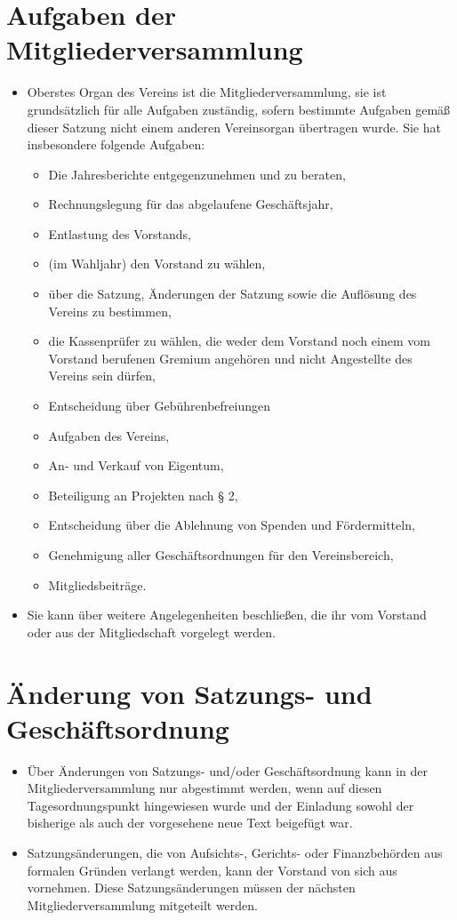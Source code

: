 \documentclass[a4paper,10pt]{article}
\begin{document}
\section{Aufgaben der Mitgliederversammlung}
  \begin{itemize}
   \item Oberstes Organ des Vereins ist die Mitgliederversammlung, sie ist grundsätzlich für alle Aufgaben zuständig, sofern bestimmte Aufgaben gemäß dieser Satzung nicht einem anderen Vereinsorgan übertragen wurde. Sie hat insbesondere folgende Aufgaben: 
   \begin{itemize}
    \item Die Jahresberichte entgegenzunehmen und zu beraten, 
    \item Rechnungslegung für das abgelaufene Geschäftsjahr, 
    \item Entlastung des Vorstands, 
    \item (im Wahljahr) den Vorstand zu wählen, 
    \item über die Satzung, Änderungen der Satzung sowie die Auflösung des Vereins zu bestimmen, 
    \item die Kassenprüfer zu wählen, die weder dem Vorstand noch einem vom Vorstand berufenen Gremium angehören und nicht Angestellte des Vereins sein dürfen, 
    \item Entscheidung über Gebührenbefreiungen
    \item Aufgaben des Vereins, 
    \item An- und Verkauf von Eigentum, 
    \item Beteiligung an Projekten nach § 2, 
    \item Entscheidung über die Ablehnung von Spenden und Fördermitteln, 
    \item Genehmigung aller Geschäftsordnungen für den Vereinsbereich, 
    \item Mitgliedsbeiträge. 
   \end{itemize}
   \item Sie kann über weitere Angelegenheiten beschließen, die ihr vom Vorstand oder aus der Mitgliedschaft vorgelegt werden. 
  \end{itemize}
  
\section{Änderung von Satzungs- und Geschäftsordnung}
  \begin{itemize}
   \item Über Änderungen von Satzungs- und/oder Geschäftsordnung kann in der Mitgliederversammlung nur abgestimmt werden, wenn auf diesen Tagesordnungspunkt hingewiesen wurde und der Einladung sowohl der bisherige als auch der vorgesehene neue Text beigefügt war.
   \item Satzungsänderungen, die von Aufsichts-, Gerichts- oder Finanzbehörden aus formalen Gründen verlangt werden, kann der Vorstand von sich aus vornehmen. Diese Satzungsänderungen müssen der nächsten Mitgliederversammlung mitgeteilt werden.
  \end{itemize}
\end{document}
